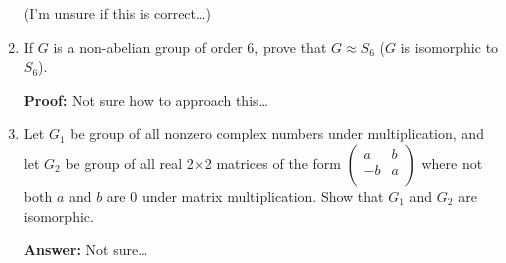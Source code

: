 \documentclass[11pt,twoside]{article}
\newcommand{\m}[1]{\begin{pmatrix}#1\end{pmatrix}}
\begin{document}
\begin{enumerate}
	(I'm unsure if this is correct\dots)

	\item If \( G\) is a non-abelian group of order 6, prove that \( G\approx S_{6}\) (\( G\) is isomorphic to \( S_{6}\)).
	
	\textbf{Proof:} Not sure how to approach this\dots

	\item Let \( G_{1} \) be group of all nonzero complex numbers under multiplication, and let \( G_{2}\) be group of all real 2\( \times\)2 matrices of the form $ \m{a & b \\ -b & a \\} $
	where not both \( a\) and \( b\) are 0 under matrix multiplication. Show that \( G_{1}\) and \( G_{2}\) are isomorphic.
	
	\textbf{Answer: } Not sure\dots

\end{enumerate}
\end{document}
